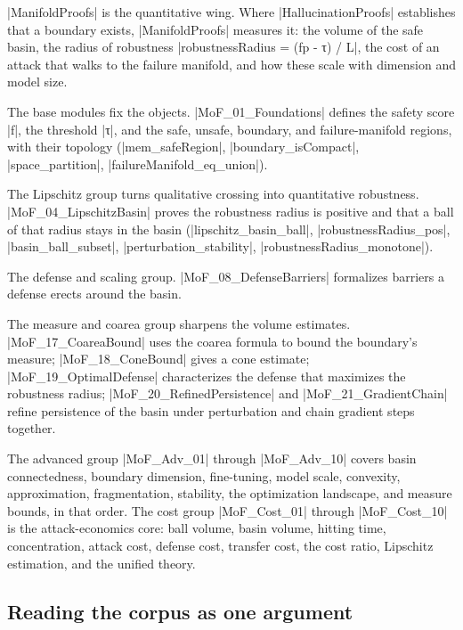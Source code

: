 \documentclass{memoir}
\begin{document}
\LeanVerb|ManifoldProofs| is the quantitative wing. Where \LeanVerb|HallucinationProofs| establishes
that a boundary exists, \LeanVerb|ManifoldProofs| measures it: the volume of the safe basin,
the radius of robustness \LeanVerb|robustnessRadius = (fp - τ) / L|, the cost of an attack
that walks to the failure manifold, and how these scale with dimension and model
size.

The base modules fix the objects. \LeanVerb|MoF_01_Foundations| defines the safety score \LeanVerb|f|,
the threshold \LeanVerb|τ|, and the safe, unsafe, boundary, and failure-manifold regions,
with their topology (\LeanVerb|mem_safeRegion|, \LeanVerb|boundary_isCompact|, \LeanVerb|space_partition|,
\LeanVerb|failureManifold_eq_union|).

The Lipschitz group turns qualitative crossing into quantitative robustness.
\LeanVerb|MoF_04_LipschitzBasin| proves the robustness radius is positive and that a ball of
that radius stays in the basin (\LeanVerb|lipschitz_basin_ball|, \LeanVerb|robustnessRadius_pos|,
\LeanVerb|basin_ball_subset|, \LeanVerb|perturbation_stability|, \LeanVerb|robustnessRadius_monotone|).

The defense and scaling group. \LeanVerb|MoF_08_DefenseBarriers| formalizes barriers a
defense erects around the basin.

The measure and coarea group sharpens the volume estimates. \LeanVerb|MoF_17_CoareaBound|
uses the coarea formula to bound the boundary's measure; \LeanVerb|MoF_18_ConeBound| gives a
cone estimate; \LeanVerb|MoF_19_OptimalDefense| characterizes the defense that maximizes the
robustness radius; \LeanVerb|MoF_20_RefinedPersistence| and \LeanVerb|MoF_21_GradientChain| refine
persistence of the basin under perturbation and chain gradient steps together.

The advanced group \LeanVerb|MoF_Adv_01| through \LeanVerb|MoF_Adv_10| covers basin connectedness,
boundary dimension, fine-tuning, model scale, convexity, approximation,
fragmentation, stability, the optimization landscape, and measure bounds, in that
order. The cost group \LeanVerb|MoF_Cost_01| through \LeanVerb|MoF_Cost_10| is the attack-economics
core: ball volume, basin volume, hitting time, concentration, attack cost, defense
cost, transfer cost, the cost ratio, Lipschitz estimation, and the unified theory.



\subsection{Reading the corpus as one argument}\label{Two--Schemas--of--Impossibility-005F-005F-005F--Machine--Checked--Limits--of--Trustworthy--Machine--Learning-005F-005F-005F--and--Why--They--Tighten--with--Capability----Appendices----The--Formal--Corpus----Reading--the--corpus--as--one--argument}
\end{document}
